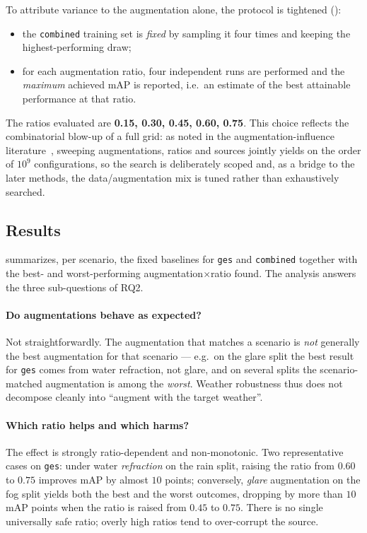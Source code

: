 To attribute variance to the augmentation alone, the protocol is tightened
():
\begin{itemize}
    \item the \texttt{combined} training set is \emph{fixed} by sampling it four times
    and keeping the highest-performing draw;
    \item for each augmentation ratio, four independent runs are performed and the
    \emph{maximum} achieved mAP is reported, i.e.\ an estimate of the best attainable
    performance at that ratio.
\end{itemize}
The ratios evaluated are \textbf{0.15, 0.30, 0.45, 0.60, 0.75}. This choice reflects
the combinatorial blow-up of a full grid: as noted in the augmentation-influence
literature~\cite{ruter2025augmentations}, sweeping augmentations, ratios and sources
jointly yields on the order of $10^9$ configurations, so the search is deliberately
scoped and, as a bridge to the later methods, the data/augmentation mix is tuned
rather than exhaustively searched.

\subsection{Results}
\label{subsec:aug-results}
 summarizes, per scenario, the fixed baselines for
\texttt{ges} and \texttt{combined} together with the best- and worst-performing
augmentation$\times$ratio found. The analysis answers the three sub-questions of RQ2.

\paragraph{Do augmentations behave as expected?}
Not straightforwardly. The augmentation that matches a scenario is \emph{not}
generally the best augmentation for that scenario --- e.g.\ on the glare split the best
result for \texttt{ges} comes from water refraction, not glare, and on several splits
the scenario-matched augmentation is among the \emph{worst}. Weather robustness thus
does not decompose cleanly into ``augment with the target weather''.

\paragraph{Which ratio helps and which harms?}
The effect is strongly ratio-dependent and non-monotonic. Two representative cases on
\texttt{ges}: under water \emph{refraction} on the rain split, raising the ratio from
$0.60$ to $0.75$ improves mAP by almost $10$ points; conversely, \emph{glare}
augmentation on the fog split yields both the best and the worst outcomes, dropping by
more than $10$ mAP points when the ratio is raised from $0.45$ to $0.75$. There is no
single universally safe ratio; overly high ratios tend to over-corrupt the source.

